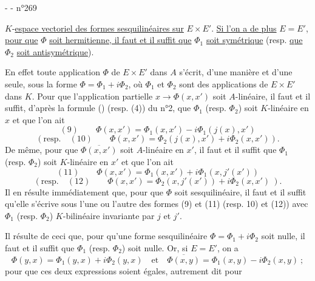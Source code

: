 -  -
\hfill n°269

$K$-\uline{espace vectoriel des formes sesquilinéaires sur} $E\times E'$. \uline{Si l'on a de plus} $E=E'$, \uline{pour que} $\Phi$ \uline{soit hermitienne, il faut et il suffit que} $\Phi_1$ \uline{soit symétrique} (resp. \uline{que} $\Phi_2$ \uline{soit antisymétrique}).

En effet toute application $\Phi$ de $E\times E'$ dans $A$ s'écrit, d'une manière et d'une seule, sous la forme $\Phi=\Phi_1+i\Phi_2$, où $\Phi_1$ et $\Phi_2$ sont des applications de $E\times E'$ dans $K$. Pour que l'application partielle $x\longrightarrow\Phi(x,x')$ soit $A$-linéaire, il faut et il suffit, d'après la formule () (resp. (4)) du n°2, que $\Phi_1$ (resp. $\Phi_2$) soit $K$-linéaire en $x$ et que l'on ait
\[
(9)\qquad\Phi(x,x')=\Phi_1(x,x')-i\Phi_1(j(x),x')
\]
\[
(\text{resp.}\quad(10)\qquad\Phi(x,x')=\Phi_2(j(x),x')+i\Phi_2(x,x')).
\]
De même, pour que $\overline{\Phi(x,x')}$ soit $A$-linéaire en $x'$, il faut et il suffit que $\Phi_1$ (resp. $\Phi_2$) soit $K$-linéaire en $x'$ et que l'on ait
\[
(11)\qquad\Phi(x,x')=\Phi_1(x,x')+i\Phi_1(x,j'(x'))
\]
\[
(\text{resp.}\quad(12)\qquad\Phi(x,x')=\Phi_2(x,j'(x'))+i\Phi_2(x,x')\ ).
\]
Il en résulte immédiatement que, pour que $\Phi$ soit sesquilinéaire, il faut et il suffit qu'elle s'écrive sous l'une ou l'autre des formes (9) et (11) (resp. 10) et (12)) avec $\Phi_1$ (resp. $\Phi_2$) $K$-bilinéaire invariante par $j$ et $j'$.

Il résulte de ceci que, pour qu'une forme sesquilinéaire $\Phi=\Phi_1+i\Phi_2$ soit nulle, il faut et il suffit que $\Phi_1$ (resp. $\Phi_2$) soit nulle. Or, si $E=E'$, on a
\[
\Phi(y,x)=\Phi_1(y,x)+i\Phi_2(y,x)\quad\text{et}\quad\overline{\Phi(x,y)}=\Phi_1(x,y)-i\Phi_2(x,y)\ ;
\]
pour que ces deux expressions soient égales, autrement dit pour
